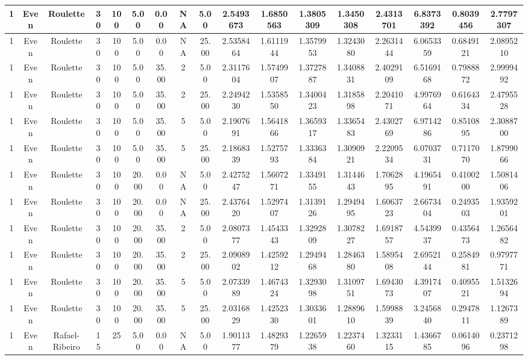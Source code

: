 \begin{longtable}{ | c | c | c | c | c | c | c | c | c | c | c | c | c | c | c | c | c | }
	\hline
	1	&	Even	&	Roulette	&	30	&	100	&	5.00	&	0.00	&	NA	&	5.00	&	2.5493673	&	1.6850563	&	1.3805309	&	1.3450308	&	2.4313701	&	6.8373392	&	0.8039456	&	2.7797307 \\
	\hline
	1	&	Even	&	Roulette	&	30	&	100	&	5.00	&	0.00	&	NA	&	25.00	&	2.5358464	&	1.6111944	&	1.3579953	&	1.3243080	&	2.2631444	&	6.0653359	&	0.6849121	&	2.0895210 \\
	\hline
	1	&	Even	&	Roulette	&	30	&	100	&	5.00	&	35.00	&	2	&	5.00	&	2.3117604	&	1.5749907	&	1.3727887	&	1.3408831	&	2.4029109	&	6.5169168	&	0.7988872	&	2.9999492 \\
	\hline
	1	&	Even	&	Roulette	&	30	&	100	&	5.00	&	35.00	&	2	&	25.00	&	2.2494230	&	1.5358550	&	1.3400423	&	1.3185898	&	2.2041071	&	4.9976964	&	0.6164334	&	2.4795528 \\
	\hline
	1	&	Even	&	Roulette	&	30	&	100	&	5.00	&	35.00	&	5	&	5.00	&	2.1907691	&	1.5641866	&	1.3659317	&	1.3365483	&	2.4302769	&	6.9714286	&	0.8510895	&	2.3088700 \\
	\hline
	1	&	Even	&	Roulette	&	30	&	100	&	5.00	&	35.00	&	5	&	25.00	&	2.1868339	&	1.5275793	&	1.3336384	&	1.3090921	&	2.2209534	&	6.0703731	&	0.7117070	&	1.8799066 \\
	\hline
	1	&	Even	&	Roulette	&	30	&	100	&	20.00	&	0.00	&	NA	&	5.00	&	2.4275247	&	1.5607271	&	1.3349155	&	1.3144643	&	1.7062895	&	4.1965491	&	0.4100200	&	1.5081406 \\
	\hline
	1	&	Even	&	Roulette	&	30	&	100	&	20.00	&	0.00	&	NA	&	25.00	&	2.4376420	&	1.5297407	&	1.3139126	&	1.2949495	&	1.6063723	&	2.6673404	&	0.2493503	&	1.9359201 \\
	\hline
	1	&	Even	&	Roulette	&	30	&	100	&	20.00	&	35.00	&	2	&	5.00	&	2.0807377	&	1.4543343	&	1.3292809	&	1.3078227	&	1.6918757	&	4.5439937	&	0.4356473	&	1.2656482 \\
	\hline
	1	&	Even	&	Roulette	&	30	&	100	&	20.00	&	35.00	&	2	&	25.00	&	2.0908902	&	1.4259212	&	1.2949468	&	1.2846380	&	1.5895408	&	2.6952144	&	0.2584981	&	0.9797771 \\
	\hline
	1	&	Even	&	Roulette	&	30	&	100	&	20.00	&	35.00	&	5	&	5.00	&	2.0733989	&	1.4674324	&	1.3293098	&	1.3109751	&	1.6943073	&	4.3917407	&	0.4095521	&	1.5132694 \\
	\hline
	1	&	Even	&	Roulette	&	30	&	100	&	20.00	&	35.00	&	5	&	25.00	&	2.0316829	&	1.4252330	&	1.3033601	&	1.2889610	&	1.5998839	&	3.2456840	&	0.2947811	&	1.1267389 \\
	\hline
	1	&	Even	&	Rafael-Ribeiro	&	15	&	25	&	5.00	&	0.00	&	NA	&	5.00	&	1.9011377	&	1.4829379	&	1.2265938	&	1.2237460	&	1.3233115	&	1.4366785	&	0.0614096	&	0.2371298 \\

\end{longtable}
